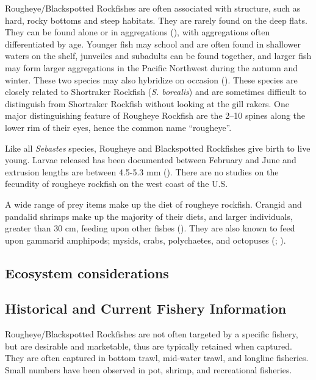 \documentclass[
]{scrartcl}
\begin{document}
Rougheye/Blackspotted Rockfishes are often associated with structure,
such as hard, rocky bottoms and steep habitats. They are rarely found on
the deep flats. They can be found alone or in aggregations
(), with aggregations often differentiated by age. Younger fish may
school and are often found in shallower waters on the shelf, junveiles
and subadults can be found together, and larger fish may form larger
aggregations in the Pacific Northwest during the autumn and winter.
These two species may also hybridize on occasion
(). These species are
closely related to Shortraker Rockfish (\emph{S. borealis}) and are
sometimes difficult to distinguish from Shortraker Rockfish without
looking at the gill rakers. One major distinguishing feature of Rougheye
Rockfish are the 2--10 spines along the lower rim of their eyes, hence
the common name ``rougheye''.

Like all \emph{Sebastes} species, Rougheye and Blackspotted Rockfishes
give birth to live young. Larvae released has been documented between
February and June and extrusion lengths are between 4.5-5.3 mm
(). There are no studies on the fecundity of rougheye rockfish on
the west coast of the U.S.

A wide range of prey items make up the diet of rougheye rockfish.
Crangid and pandalid shrimps make up the majority of their diets, and
larger individuals, greater than 30 cm, feeding upon other fishes
(). They are also known to
feed upon gammarid amphipods; mysids, crabs, polychaetes, and octopuses
(; ).

\subsection{Ecosystem considerations}\label{ecosystem-considerations}

\subsection{Historical and Current Fishery
Information}\label{historical-and-current-fishery-information}

Rougheye/Blackspotted Rockfishes are not often targeted by a specific
fishery, but are desirable and marketable, thus are typically retained
when captured. They are often captured in bottom trawl, mid-water trawl,
and longline fisheries. Small numbers have been observed in pot, shrimp,
and recreational fisheries.
\end{document}
